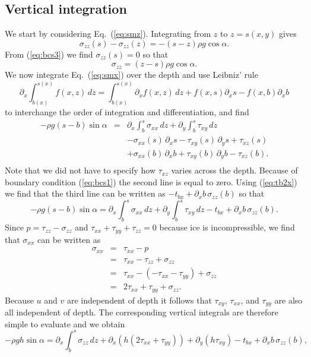 \documentclass[10pt,a4paper]{book}
\newcommand{\p}{\partial}
\newcommand{\txx}{\tau_{xx}}
\newcommand{\tyy}{\tau_{yy}}
\newcommand{\tzz}{\tau_{zz}}
\newcommand{\txy}{\tau_{xy}}
\newcommand{\txz}{\tau_{xz}}
\newcommand{\sxx}{\sigma_{xx}}
\newcommand{\szz}{\sigma_{zz}}
\begin{document}
\subsection{Vertical integration}

We start by considering Eq.~(\ref{eq:smz}). Integrating from $z$ to $z=s(x,y)$ gives
\begin{equation}
\szz(s)-\szz(z)=-(s-z) \rho g \cos \alpha .
\label{eq:szz1}
\end{equation}
From (\ref{eq:bcs3}) we find $\szz(s)=0$ so that
\begin{equation}
\szz=(z-s) \rho g \cos \alpha . \label{eq:szz}
\end{equation}
We now integrate Eq.~(\ref{eq:smx}) over the depth and use Leibniz'
rule 
\[ 
\p_x \int_{b(x)}^{s(x)} f(x,z) \, dz
=\int_{b(x)}^{s(x)} \p_x f(x,z) \, dz + f(x,s) \p_x s - f(x,b) \p_x b
\] 
to interchange the order of integration and differentiation, and find
\begin{eqnarray*}
-\rho g (s-b) \sin \alpha&=& \p_x \int_{b}^{s} \sxx \, dz +\p_y \int_{b}^{s} \txy \, dz \\
& & - \sxx(s)\, \p_x s -\txy(s)\, \p_y s +\txz(s) \\
& & +\sxx(b)\, \p_x b +\txy(b)\, \p_y b -\txz(b) .\\
\end{eqnarray*}
Note that we did not have to specify how $\txz$ varies across the
depth.  Because of boundary condition (\ref{eq:bcs1}) the second line
is equal to zero.  Using (\ref{eq:tb2x}) we find that the third line
can be written as $-t_{bx}+\p_x b \, \szz(b)$ so that
\[
-\rho g (s-b) \sin \alpha= \p_x \int_{b}^{s} \sxx \, dz +\p_y \int_{b}^{s} \txy \, dz 
-t_{bx}+\p_x b \, \szz(b).
\]
Since $p=\tzz-\szz$ and $\txx+\tyy+\tzz=0$ because ice is
incompressible, we find that $\sxx$ can be written as
\begin{eqnarray}
\sxx&=&\txx-p \nonumber \\
    &=&\txx-\tzz+\szz \nonumber \\
    &=& \txx -( -\txx-\tyy)+\szz  \nonumber \\
&=&2 \txx+\tyy+\szz.  \label{eq:txxrel}
\end{eqnarray}
Because $u$ and $v$ are independent of depth it follows
that $\txy$, $\txx$, and $\tyy$ are also all independent of depth. The
corresponding vertical integrals are therefore simple to evaluate and we obtain
\begin{equation}
-\rho g h \sin \alpha= \p_x \int_{b}^{s} \szz \, dz 
+\p_x (h (2\txx+\tyy)) + \p_y(h\txy)-t_{bx}+\p_x b \, \szz(b),
\label{eq:alm}
\end{equation}
\end{document}
